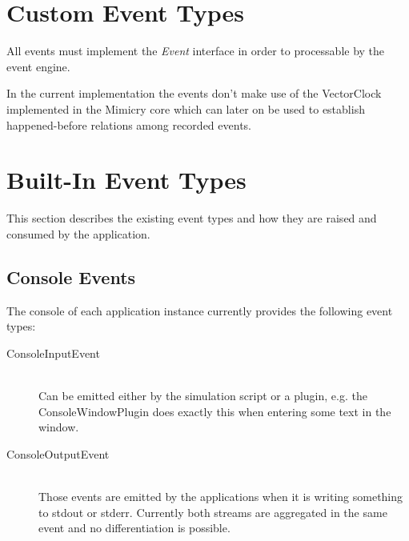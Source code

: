 \documentclass[a4paper,oneside]{book}
\begin{document}
\section{Custom Event Types}
All events must implement the \textit{Event} interface in order to processable by the event engine.

In the current implementation the events don't make use of the VectorClock implemented in the Mimicry core which can later on be used to establish happened-before relations among recorded events.

\section{Built-In Event Types}
This section describes the existing event types and how they are raised and consumed by the application.

\subsection{Console Events}
The console of each application instance currently provides the following event types:
\begin{description}
\item[ConsoleInputEvent] \hfill \\
Can be emitted either by the simulation script or a plugin, e.g. the ConsoleWindowPlugin does exactly this when entering some text in the window.

\item[ConsoleOutputEvent] \hfill \\
Those events are emitted by the applications when it is writing something to stdout or stderr. Currently both streams are aggregated in the same event and no differentiation is possible.
\end{description}
\end{document}
